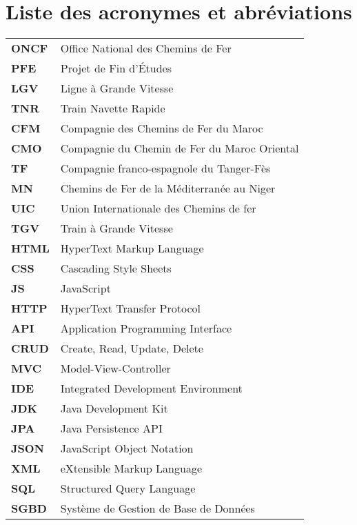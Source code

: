 \chapter*{Liste des acronymes et abréviations}

\begin{tabular}{ll}
\textbf{ONCF} & Office National des Chemins de Fer \\[0.3cm]
\textbf{PFE} & Projet de Fin d'Études \\[0.3cm]
\textbf{LGV} & Ligne à Grande Vitesse \\[0.3cm]
\textbf{TNR} & Train Navette Rapide \\[0.3cm]
\textbf{CFM} & Compagnie des Chemins de Fer du Maroc \\[0.3cm]
\textbf{CMO} & Compagnie du Chemin de Fer du Maroc Oriental \\[0.3cm]
\textbf{TF} & Compagnie franco-espagnole du Tanger-Fès \\[0.3cm]
\textbf{MN} & Chemins de Fer de la Méditerranée au Niger \\[0.3cm]
\textbf{UIC} & Union Internationale des Chemins de fer \\[0.3cm]
\textbf{TGV} & Train à Grande Vitesse \\[0.3cm]
\textbf{HTML} & HyperText Markup Language \\[0.3cm]
\textbf{CSS} & Cascading Style Sheets \\[0.3cm]
\textbf{JS} & JavaScript \\[0.3cm]
\textbf{HTTP} & HyperText Transfer Protocol \\[0.3cm]
\textbf{API} & Application Programming Interface \\[0.3cm]
\textbf{CRUD} & Create, Read, Update, Delete \\[0.3cm]
\textbf{MVC} & Model-View-Controller \\[0.3cm]
\textbf{IDE} & Integrated Development Environment \\[0.3cm]
\textbf{JDK} & Java Development Kit \\[0.3cm]
\textbf{JPA} & Java Persistence API \\[0.3cm]
\textbf{JSON} & JavaScript Object Notation \\[0.3cm]
\textbf{XML} & eXtensible Markup Language \\[0.3cm]
\textbf{SQL} & Structured Query Language \\[0.3cm]
\textbf{SGBD} & Système de Gestion de Base de Données \\[0.3cm]
\end{tabular}

\vfill

\newpage